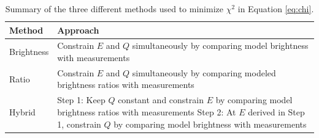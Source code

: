 \documentclass[crop=false,class=mitthesis,oneside,font=12pt]{standalone}
\begin{document}
\begin{table}
	
	\caption{Summary of the three different methods used to minimize $\chi^2$ in Equation \ref{eq:chi}.}
	\begin{tabular}{|l|l|}
		\hline
		
		Method &  Approach \\
		\hline
		\centering
		Brightness & \makecell{Constrain $E$ and $Q$ simultaneously\\ by comparing model brightness with measurements}\\ 
		
		\hline
		Ratio  &  \makecell{Constrain $E$ and $Q$ simultaneously\\ by comparing modeled brightness ratios with measurements}\\
		\hline
		
		Hybrid & \makecell{Step 1: Keep $Q$ constant and constrain $E$\\
			by comparing model brightness ratios with measurements\\
			\hline			
			Step 2: At $E$ derived in Step 1, constrain $Q$\\
			by comparing model brightness with measurements}\\
		\hline
	\end{tabular}
	\label{table:method}
\end{table}
\end{document}
